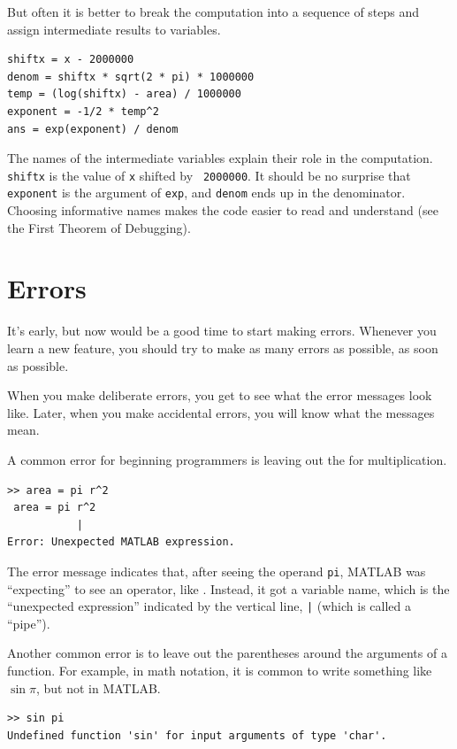\documentclass[
]{book}
\begin{document}
\begin{itemize}
But often it is better to break the computation into a sequence of
steps and assign intermediate results to variables.

\begin{verbatim}
shiftx = x - 2000000
denom = shiftx * sqrt(2 * pi) * 1000000
temp = (log(shiftx) - area) / 1000000
exponent = -1/2 * temp^2
ans = exp(exponent) / denom
\end{verbatim}

The names of the intermediate variables explain their role in the
computation.  {\tt shiftx} is the value of {\tt x} shifted by {\tt
2000000}.  It should be no surprise that {\tt exponent} is the argument
of {\tt exp}, and {\tt denom} ends up in the denominator.  Choosing
informative names makes the code easier to read and understand (see
the First Theorem of Debugging).

\end{itemize}


\section{Errors}

It's early, but now would be a good time to start making errors.
Whenever you learn a new feature, you should try
to make as many errors as possible, as soon as possible.

When you make deliberate errors, you get to see what the error messages
look like.  Later, when you make accidental errors, you will know what
the messages mean.

A common error for beginning programmers is leaving out the {\tt *}
for multiplication.

\begin{verbatim}
>> area = pi r^2
 area = pi r^2
           |
Error: Unexpected MATLAB expression.
\end{verbatim}

The error message indicates that, after seeing the operand {\tt pi},
MATLAB was ``expecting'' to see an operator, like {\tt *}.  Instead,
it got a variable name, which is the ``unexpected expression'' indicated
by the vertical line, {\tt |} (which is called a ``pipe'').

Another common error is to leave out the parentheses around the
arguments of a function.  For example, in math notation, it is common
to write something like $\sin \pi$, but not in MATLAB.

\begin{verbatim}
>> sin pi
Undefined function 'sin' for input arguments of type 'char'.
\end{verbatim}
\end{document}
